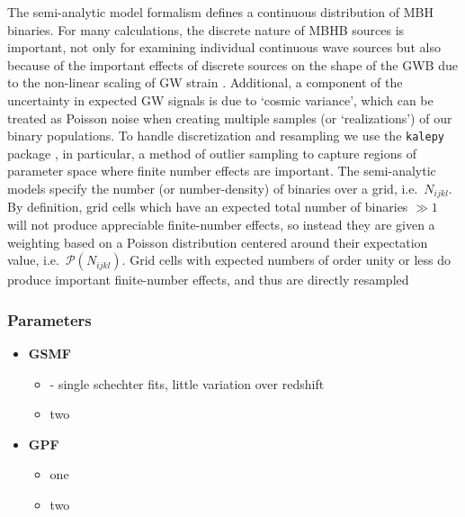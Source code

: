\documentclass[useAMS, usenatbib]{src/mnras}
\begin{document}
        The semi-analytic model formalism defines a continuous distribution of MBH binaries.  For many calculations, the discrete nature of MBHB sources is important, not only for examining individual continuous wave sources but also because of the important effects of discrete sources on the shape of the GWB due to the non-linear scaling of GW strain \citep{Sesana+2008}.  Additional, a component of the uncertainty in expected GW signals is due to `cosmic variance', which can be treated as Poisson noise when creating multiple samples (or `realizations') of our binary populations.  To handle discretization and resampling we use the \texttt{kalepy} package \citep{kalepy2021}, in particular, a method of outlier sampling to capture regions of parameter space where finite number effects are important.  The \holodeck{} semi-analytic models specify the number (or number-density) of binaries over a grid, i.e.~$N_{ijkl}$.  By definition, grid cells which have an expected total number of binaries $\gg 1$ will not produce appreciable finite-number effects, so instead they are given a weighting based on a Poisson distribution centered around their expectation value, i.e.~$\mathcal{P}(N_{ijkl})$.  Grid cells with expected numbers of order unity or less do produce important finite-number effects, and thus are directly resampled

        \subsubsection{Parameters}

            \begin{itemize}
                \item \textbf{GSMF}
                \begin{itemize}
                    \item \citep{Tomczak+2014} - single schechter fits, little variation over redshift\\
                    \item two
                \end{itemize}


                \item \textbf{GPF}
                \begin{itemize}
                    \item one \\
                    \item two
                \end{itemize}


            \end{itemize}
\end{document}

